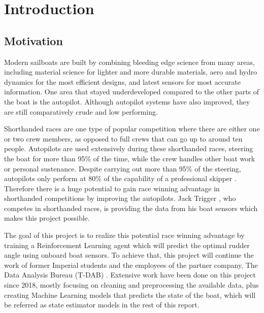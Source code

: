 \documentclass[12pt,twoside]{report}
\begin{document}
\clearpage{\pagestyle{empty}\cleardoublepage}


\tableofcontents 


\clearpage{\pagestyle{empty}%
}
\fancyhead[LE,RO]{\slshape \rightmark}
\fancyhead[LO,RE]{\slshape \leftmark}


\chapter{Introduction}

\section{Motivation}
Modern sailboats are built by combining bleeding edge science from many areas, including material science for lighter and more durable materials, aero and hydro dynamics for the most efficient designs, and latest sensors for most accurate information. One area that stayed underdeveloped compared to the other parts of the boat is the autopilot. Although autopilot systems have also improved, they are still comparatively crude and low performing.

Shorthanded races are one type of popular competition where there are either one or two crew members, as opposed to full crews that can go up to around ten people. Autopilots are used extensively during these shorthanded races, steering the boat for more than 95\% of the time, while the crew handles other boat work or personal sustenance. Despite carrying out more than 95\% of the steering, autopilots only perform at 80\% of the capability of a professional skipper \cite{trigger-racing}. Therefore there is a huge potential to gain race winning advantage in shorthanded competitions by improving the autopilots. Jack Trigger \cite{trigger-racing}, who competes in shorthanded races, is providing the data from his boat sensors which makes this project possible. 

The goal of this project is to realize this potential race winning advantage by training a Reinforcement Learning agent which will predict the optimal rudder angle using onboard boat sensors. To achieve that, this project will continue the work of former Imperial students and the employees of the partner company, The Data Analysis Bureau (T-DAB) \cite{t-dab}. Extensive work have been done on this project since 2018, mostly focusing on cleaning and preprocessing the available data, plus creating Machine Learning models that predicts the state of the boat, which will be referred as state estimator models in the rest of this report.
\end{document}
